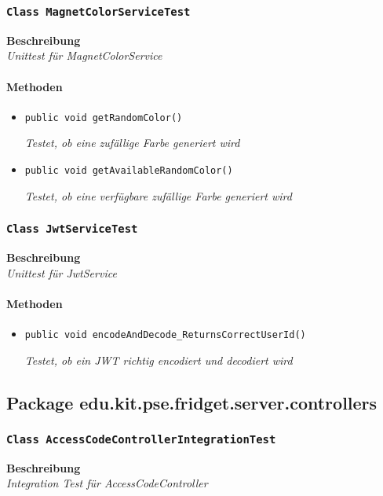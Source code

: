  \subsubsection{\texttt{Class MagnetColorServiceTest}}
 \textbf{Beschreibung} \\
 \textit{Unittest für MagnetColorService}
\paragraph*{Methoden}
\begin{itemize}
	\item{\texttt{public void getRandomColor()}}
	
	\textit{Testet, ob eine zufällige Farbe generiert wird}
	
	\item{\texttt{public void getAvailableRandomColor()}}
	
	\textit{Testet, ob eine verfügbare zufällige Farbe generiert wird}	
\end{itemize}

\subsubsection{\texttt{Class JwtServiceTest}}
\textbf{Beschreibung} \\
\textit{Unittest für JwtService}
\paragraph*{Methoden}
\begin{itemize}
   	\item{\texttt{public void encodeAndDecode\_ReturnsCorrectUserId()}}
   	
   	\textit{Testet, ob ein JWT richtig encodiert und decodiert wird}
\end{itemize}

\newpage

 \subsection{Package edu.kit.pse.fridget.server.controllers}
 \subsubsection{\texttt{Class AccessCodeControllerIntegrationTest}}
 \textbf{Beschreibung} \\
 \textit{Integration Test für AccessCodeController}
